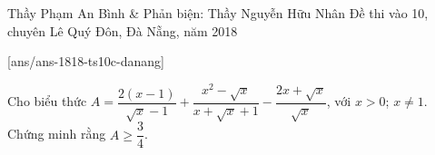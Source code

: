 \begin{name}
{Thầy  Phạm An Bình \& Phản biện: Thầy Nguyễn Hữu Nhân}
{Đề thi vào 10, chuyên Lê Quý Đôn, Đà Nẵng, năm 2018}
\end{name}
\setcounter{ex}{0}
[ans/ans-1818-ts10c-danang]

\begin{ex}%
    Cho biểu thức $A=\dfrac{2(x-1)}{\sqrt{x}-1}+\dfrac{x^2-\sqrt{x}}{x+\sqrt{x}+1}-\dfrac{2x+\sqrt{x}}{\sqrt{x}}$, với $x>0$; $x\ne 1$.\\ Chứng minh rằng $A\ge \dfrac{3}{4}$.
\end{ex}

